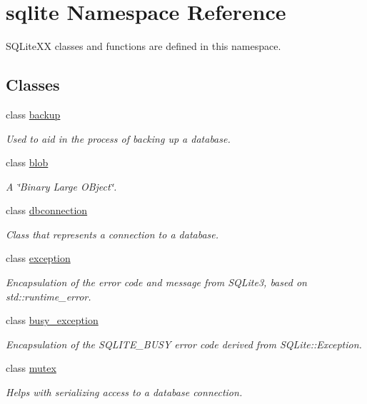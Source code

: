\hypertarget{a00038}{\section{sqlite Namespace Reference}
\label{a00038}
}


S\-Q\-Lite\-X\-X classes and functions are defined in this namespace.  


\subsection*{Classes}
\begin{DoxyCompactItemize}
\item 
class \hyperlink{a00001}{backup}
\begin{DoxyCompactList}\small\item\em Used to aid in the process of backing up a database. \end{DoxyCompactList}\item 
class \hyperlink{a00002}{blob}
\begin{DoxyCompactList}\small\item\em A \char`\"{}\-Binary Large O\-Bject\char`\"{}. \end{DoxyCompactList}\item 
class \hyperlink{a00004}{dbconnection}
\begin{DoxyCompactList}\small\item\em Class that represents a connection to a database. \end{DoxyCompactList}\item 
class \hyperlink{a00006}{exception}
\begin{DoxyCompactList}\small\item\em Encapsulation of the error code and message from S\-Q\-Lite3, based on std\-::runtime\-\_\-error. \end{DoxyCompactList}\item 
class \hyperlink{a00003}{busy\-\_\-exception}
\begin{DoxyCompactList}\small\item\em Encapsulation of the S\-Q\-L\-I\-T\-E\-\_\-\-B\-U\-S\-Y error code derived from S\-Q\-Lite\-::\-Exception. \end{DoxyCompactList}\item 
class \hyperlink{a00009}{mutex}
\begin{DoxyCompactList}\small\item\em Helps with serializing access to a database connection. \end{DoxyCompactList}\item 

\end{DoxyCompactItemize}

